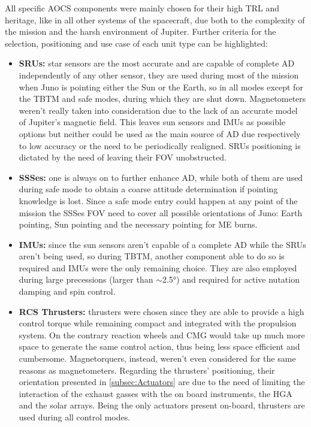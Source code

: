 All specific AOCS components were mainly chosen for their high TRL and heritage, like in all other systems of the spacecraft, due both to the complexity of the mission and the harsh environment of Jupiter. Further criteria for the selection, positioning and use case of each unit type can be highlighted:
\begin{itemize}
    \item \textbf{SRUs:} star sensors are the most accurate and are capable of complete AD independently of any other sensor, they are used during most of the mission when Juno is pointing either the Sun or the Earth, so in all modes except for the TBTM and safe modes, during which they are shut down. Magnetometers weren't really taken into consideration due to the lack of an accurate model of Jupiter's magnetic field. This leaves sun sensors and IMUs as possible options but neither could be used as the main source of AD due respectively to low accuracy or the need to be periodically realigned. SRUs positioning is dictated by the need of leaving their FOV unobstructed.
    \item \textbf{SSSes:} one is always on to further enhance AD, while both of them are used during safe mode to obtain a coarse attitude determination if pointing knowledge is lost. Since a safe mode entry could happen at any point of the mission the SSSes FOV need to cover all possible orientations of Juno: Earth pointing, Sun pointing and the necessary pointing for ME burns.
    \item \textbf{IMUs:} since the sun sensors aren't capable of a complete AD while the SRUs aren't being used, so during TBTM, another component able to do so is required and IMUs were the only remaining choice. They are also employed during large precessions (larger than $\sim$2.5°) and required for active nutation damping and spin control. \cite{juno_sito}
    \item \textbf{RCS Thrusters:} thrusters were chosen since they are able to provide a high control torque while remaining compact and integrated with the propulsion system. On the contrary reaction wheels and CMG would take up much more space to generate the same control action, thus being less space efficient and cumbersome. Magnetorquers, instead, weren't even considered for the same reasons as magnetometers. Regarding the thrusters' positioning, their orientation presented in \autoref{subsec:Actuators} are due to the need of limiting the interaction of the exhaust gasses with the on board instruments, the HGA and the solar arrays. Being the only actuators present on-board, thrusters are used during all control modes.     
\end{itemize}  
